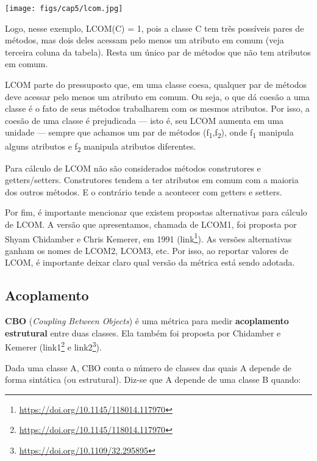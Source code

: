 \documentclass[
  11pt,
  twoside]{book}
\DeclareRobustCommand{\href}[2]{#2\footnote{\url{#1}}}
\let\origfigure\figure
\let\endorigfigure\endfigure
\renewenvironment{figure}[1][2] {
    \expandafter\origfigure\expandafter[!h]
} {
    \endorigfigure
}
\begin{document}
\begin{figure}
\centering
\texttt{[image: figs/cap5/lcom.jpg]}
\caption{Exemplo de cálculo de LCOM}
\end{figure}

Logo, nesse exemplo, LCOM(C) = 1, pois a classe C tem três possíveis
pares de métodos, mas dois deles acessam pelo menos um atributo em comum
(veja terceira coluna da tabela). Resta um único par de métodos que não
tem atributos em comum.

LCOM parte do pressuposto que, em uma classe coesa, qualquer par de
métodos deve acessar pelo menos um atributo em comum. Ou seja, o que dá
coesão a uma classe é o fato de seus métodos trabalharem com os mesmos
atributos. Por isso, a coesão de uma classe é prejudicada --- isto é,
seu LCOM aumenta em uma unidade --- sempre que achamos um par de métodos
(f\textsubscript{1},f\textsubscript{2}), onde f\textsubscript{1}
manipula alguns atributos e f\textsubscript{2} manipula atributos
diferentes.

Para cálculo de LCOM não são considerados métodos construtores e
getters/setters. Construtores tendem a ter atributos em comum com a
maioria dos outros métodos. E o contrário tende a acontecer com getters
e setters.

Por fim, é importante mencionar que existem propostas alternativas para
cálculo de LCOM. A versão que apresentamos, chamada de LCOM1, foi
proposta por Shyam Chidamber e Chris Kemerer, em 1991
(\href{https://doi.org/10.1145/118014.117970}{link}). As versões
alternativas ganham os nomes de LCOM2, LCOM3, etc. Por isso, ao reportar
valores de LCOM, é importante deixar claro qual versão da métrica está
sendo adotada.

\hypertarget{acoplamento-1}{%
\subsection{Acoplamento}\label{acoplamento-1}}


\textbf{CBO} (\emph{Coupling Between Objects}) é uma métrica para medir
\textbf{acoplamento estrutural} entre duas classes. Ela também foi
proposta por Chidamber e Kemerer
(\href{https://doi.org/10.1145/118014.117970}{{link1}} e
\href{https://doi.org/10.1109/32.295895}{{link2}}).

Dada uma classe A, CBO conta o número de classes das quais A depende de
forma sintática (ou estrutural). Diz-se que A depende de uma classe B
quando:
\end{document}
